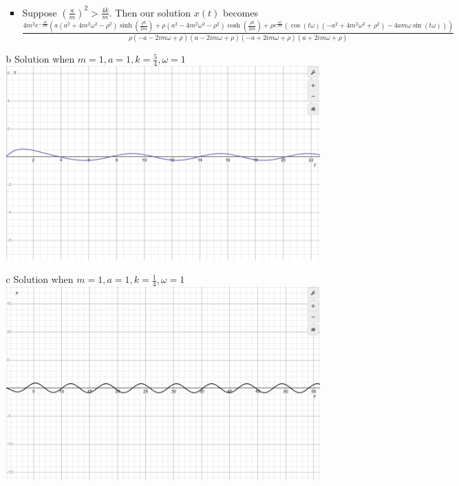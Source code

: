 \documentclass[12pt, letterpaper]{article}
\begin{document}
\begin{enumerate}
\begin{enumerate}
\begin{itemize}
			\item Suppose $(\frac{a}{m})^2 > \frac{4k}{m}$.  Then our solution $x(t)$ becomes\\ 
			$
\frac{4 m^2 e^{-\frac{a t}{2 m}} \left(a \left(a^2+4 m^2 \omega ^2-\rho ^2\right) \sinh \left(\frac{\rho  t}{2 m}\right)+\rho  \left(a^2-4 m^2
   \omega ^2-\rho ^2\right) \cosh \left(\frac{\rho  t}{2 m}\right)+\rho  e^{\frac{a t}{2 m}} \left(\cos (t \omega ) \left(-a^2+4 m^2 \omega
   ^2+\rho ^2\right)-4 a m \omega  \sin (t \omega )\right)\right)}{\rho  (-a-2 i m \omega +\rho ) (a-2 i m \omega +\rho ) (-a+2 i m \omega +\rho
   ) (a+2 i m \omega +\rho )}			
			$
		\end{itemize}
		\item[b] Solution when $m=1,a=1,k=\frac{5}{4},\omega=1$\\
		\includegraphics[scale=0.3]{7b292hw6.png}
		\item[c] Solution when $m=1,a=1,k=\frac{1}{4},\omega=1$\\
		\includegraphics[scale=0.3]{7c292hw6.png}

\end{enumerate}
\end{enumerate}
\end{document}
